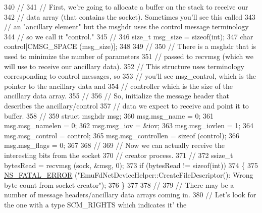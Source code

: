 \begin{DoxyCode}
340       \textcolor{comment}{//}
341       \textcolor{comment}{// First, we're going to allocate a buffer on the stack to receive our}
342       \textcolor{comment}{// data array (that contains the socket).  Sometimes you'll see this called}
343       \textcolor{comment}{// an "ancillary element" but the msghdr uses the control message terminology}
344       \textcolor{comment}{// so we call it "control."}
345       \textcolor{comment}{//}
346       \textcolor{keywordtype}{size\_t} msg\_size = \textcolor{keyword}{sizeof}(int);
347       \textcolor{keywordtype}{char} control[CMSG\_SPACE (msg\_size)];
348 
349       \textcolor{comment}{//}
350       \textcolor{comment}{// There is a msghdr that is used to minimize the number of parameters}
351       \textcolor{comment}{// passed to recvmsg (which we will use to receive our ancillary data).}
352       \textcolor{comment}{// This structure uses terminology corresponding to control messages, so}
353       \textcolor{comment}{// you'll see msg\_control, which is the pointer to the ancillary data and}
354       \textcolor{comment}{// controller which is the size of the ancillary data array.}
355       \textcolor{comment}{//}
356       \textcolor{comment}{// So, initialize the message header that describes the ancillary/control}
357       \textcolor{comment}{// data we expect to receive and point it to buffer.}
358       \textcolor{comment}{//}
359       \textcolor{keyword}{struct }msghdr msg;
360       msg.msg\_name = 0;
361       msg.msg\_namelen = 0;
362       msg.msg\_iov = &iov;
363       msg.msg\_iovlen = 1;
364       msg.msg\_control = control;
365       msg.msg\_controllen = \textcolor{keyword}{sizeof} (control);
366       msg.msg\_flags = 0;
367 
368       \textcolor{comment}{//}
369       \textcolor{comment}{// Now we can actually receive the interesting bits from the socket}
370       \textcolor{comment}{// creator process.}
371       \textcolor{comment}{//}
372       ssize\_t bytesRead = recvmsg (sock, &msg, 0);
373       \textcolor{keywordflow}{if} (bytesRead != \textcolor{keyword}{sizeof}(\textcolor{keywordtype}{int}))
374         \{
375           \hyperlink{group__fatal_ga5131d5e3f75d7d4cbfd706ac456fdc85}{NS\_FATAL\_ERROR} (\textcolor{stringliteral}{"EmuFdNetDeviceHelper::CreateFileDescriptor(): Wrong byte count
       from socket creator"});
376         \}
377 
378       \textcolor{comment}{//}
379       \textcolor{comment}{// There may be a number of message headers/ancillary data arrays coming in.}
380       \textcolor{comment}{// Let's look for the one with a type SCM\_RIGHTS which indicates it' the}

\end{DoxyCode}
